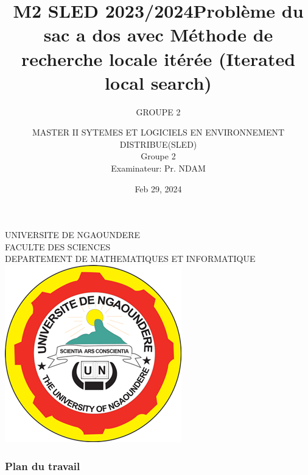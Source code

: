 \documentclass[11pt]{beamer}
\begin{document}
	\author{GROUPE 2}
	\title{M2 SLED 2023/2024}
	\subtitle{}
	\institute{}
	\date{\tiny Feb 29,  2024}
	\subject{}
	\begin{frame}[plain]
		\title{ {\small Problème du sac a dos avec Méthode de recherche locale itérée (Iterated local search)}}
		\author{{\tiny MASTER II SYTEMES ET LOGICIELS EN ENVIRONNEMENT DISTRIBUE(SLED)}\\ {\tiny Groupe 2}\\ {\tiny Examinateur: Pr. NDAM } }

		\begin{center}	
			{\footnotesize	UNIVERSITE DE NGAOUNDERE }	\\
		 {\tiny FACULTE DES SCIENCES }\\
		 {\tiny DEPARTEMENT DE MATHEMATIQUES ET INFORMATIQUE}\\
	 		\includegraphics[scale=0.1]{image}\\
	 \end{center}
		\maketitle
		 
	\end{frame}
	
	\begin{frame}
		\frametitle{Plan du travail}
		\tableofcontents
	\end{frame}

\end{document}
